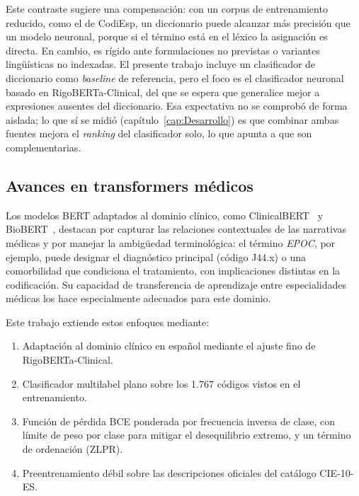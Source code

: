 Este contraste sugiere una compensación: con un corpus de entrenamiento reducido, como el de CodiEsp, un diccionario puede alcanzar más precisión que un modelo neuronal, porque si el término está en el léxico la asignación es directa. En cambio, es rígido ante formulaciones no previstas o variantes lingüísticas no indexadas. El presente trabajo incluye un clasificador de diccionario como \emph{baseline} de referencia, pero el foco es el clasificador neuronal basado en RigoBERTa-Clinical, del que se espera que generalice mejor a expresiones ausentes del diccionario. Esa expectativa no se comprobó de forma aislada; lo que sí se midió (capítulo~\ref{cap:Desarrollo}) es que combinar ambas fuentes mejora el \emph{ranking} del clasificador solo, lo que apunta a que son complementarias.

\subsection{Avances en transformers médicos}
Los modelos BERT adaptados al dominio clínico, como ClinicalBERT~\cite{alsentzer2019} y BioBERT~\cite{lee2020}, destacan por capturar las relaciones contextuales de las narrativas médicas y por manejar la ambigüedad terminológica: el término \emph{EPOC}, por ejemplo, puede designar el diagnóstico principal (código J44.x) o una comorbilidad que condiciona el tratamiento, con implicaciones distintas en la codificación. Su capacidad de transferencia de aprendizaje entre especialidades médicas los hace especialmente adecuados para este dominio.

Este trabajo extiende estos enfoques mediante:
\begin{enumerate}
\item Adaptación al dominio clínico en español mediante el ajuste fino de RigoBERTa-Clinical.
\item Clasificador multilabel plano sobre los 1.767 códigos vistos en el entrenamiento.
\item Función de pérdida BCE ponderada por frecuencia inversa de clase, con límite de peso por clase para mitigar el desequilibrio extremo, y un término de ordenación (ZLPR).
\item Preentrenamiento débil sobre las descripciones oficiales del catálogo CIE-10-ES.
\end{enumerate}

